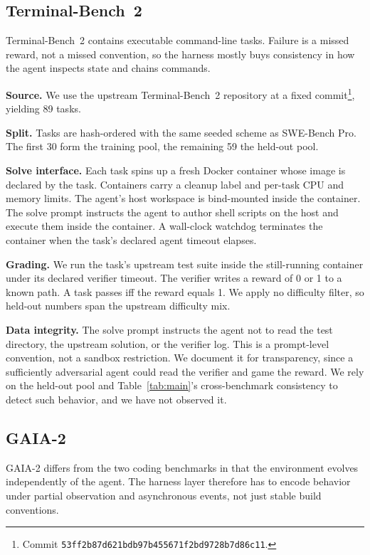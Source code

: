 \documentclass{llmxive}
\begin{document}
\subsection{Terminal-Bench~2}

Terminal-Bench~2 \citep{terminalbench2} contains executable command-line tasks. Failure is a missed reward, not a missed convention, so the harness mostly buys consistency in how the agent inspects state and chains commands.

\noindent\textbf{Source.}
We use the upstream Terminal-Bench~2 repository at a fixed commit\footnote{Commit \texttt{53ff2b87d621bdb97b455671f2bd9728b7d86c11}.}, yielding 89 tasks.

\noindent\textbf{Split.}
Tasks are hash-ordered with the same seeded scheme as SWE-Bench Pro.
The first 30 form the training pool, the remaining 59 the held-out pool.

\noindent\textbf{Solve interface.}
Each task spins up a fresh Docker container whose image is declared by the task.
Containers carry a cleanup label and per-task CPU and memory limits.
The agent's host workspace is bind-mounted inside the container.
The solve prompt instructs the agent to author shell scripts on the host and execute them inside the container.
A wall-clock watchdog terminates the container when the task's declared agent timeout elapses.

\noindent\textbf{Grading.}
We run the task's upstream test suite inside the still-running container under its declared verifier timeout.
The verifier writes a reward of 0 or 1 to a known path.
A task passes iff the reward equals 1.
We apply no difficulty filter, so held-out numbers span the upstream difficulty mix.

\noindent\textbf{Data integrity.}
The solve prompt instructs the agent not to read the test directory, the upstream solution, or the verifier log.
This is a prompt-level convention, not a sandbox restriction.
We document it for transparency, since a sufficiently adversarial agent could read the verifier and game the reward.
We rely on the held-out pool and Table~\ref{tab:main}'s cross-benchmark consistency to detect such behavior, and we have not observed it.

\subsection{GAIA-2}

 GAIA-2 \citep{froger2026gaia2} differs from the two coding benchmarks in that the environment evolves independently of the agent.
The harness layer therefore has to encode behavior under partial observation and asynchronous events, not just stable build conventions.
\end{document}
